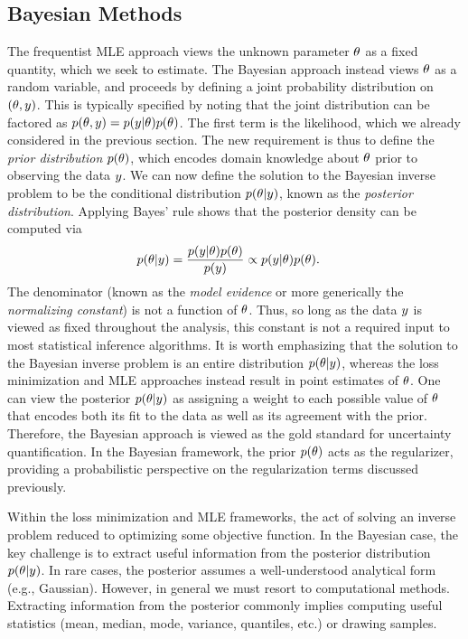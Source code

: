 \documentclass[12pt]{article}
\begin{document}
\subsection{Bayesian Methods}
The frequentist MLE approach views the unknown parameter $\theta$ as a fixed quantity, which we seek to estimate.
The Bayesian approach instead views $\theta$ as a random variable, and proceeds by defining a joint probability 
distribution on $(\theta, y)$. This is typically specified by noting that the joint distribution can be 
factored as $p(\theta, y) = p(y | \theta)p(\theta)$. The first term is the likelihood, which we already considered in 
the previous section. The new requirement is thus to define the \textit{prior distribution} $p(\theta)$, which encodes
domain knowledge about $\theta$ prior to observing the data $y$. We can now define the solution to the Bayesian 
inverse problem to be the conditional distribution $p(\theta | y)$, known as the \textit{posterior distribution}. 
Applying Bayes' rule shows that the posterior density can be computed via 
\begin{align}
p(\theta | y) &= \frac{p(y | \theta) p(\theta)}{p(y)} \propto p(y | \theta) p(\theta). 
\end{align}
The denominator (known as the \textit{model evidence} or more generically the \textit{normalizing constant}) is 
not a function of $\theta$. Thus, so long as the data $y$ is viewed as fixed throughout the analysis, this constant 
is not a required input to most statistical inference algorithms. It is worth emphasizing that the solution to the Bayesian inverse problem 
is an entire distribution $p(\theta | y)$, whereas the loss minimization and MLE approaches instead result in point 
estimates of $\theta$. One can view the posterior $p(\theta | y)$ as assigning a weight to each possible value of 
$\theta$ that encodes both its fit to the data as well as its agreement with the prior.  
Therefore, the Bayesian approach is viewed as the gold standard for uncertainty quantification. In the Bayesian framework, 
the prior $p(\theta)$ acts as the regularizer, providing a probabilistic perspective on the regularization terms discussed previously. 

Within the loss minimization and MLE frameworks, the act of solving an inverse problem reduced to optimizing some 
objective function. In the Bayesian case, the key challenge is to extract useful information from the posterior distribution 
$p(\theta | y)$. In rare cases, the posterior assumes a well-understood analytical form (e.g., Gaussian). However, in 
general we must resort to computational methods. Extracting information from the posterior commonly implies
computing useful statistics (mean, median, mode, variance, quantiles, etc.) or drawing samples. 
\end{document}
